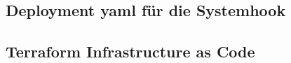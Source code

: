 \subsection{Deployment yaml für die Systemhook}
\label{app:yamlFile}

\clearpage

\subsection{Terraform Infrastructure as Code}
\label{app:terraform}

\clearpage

